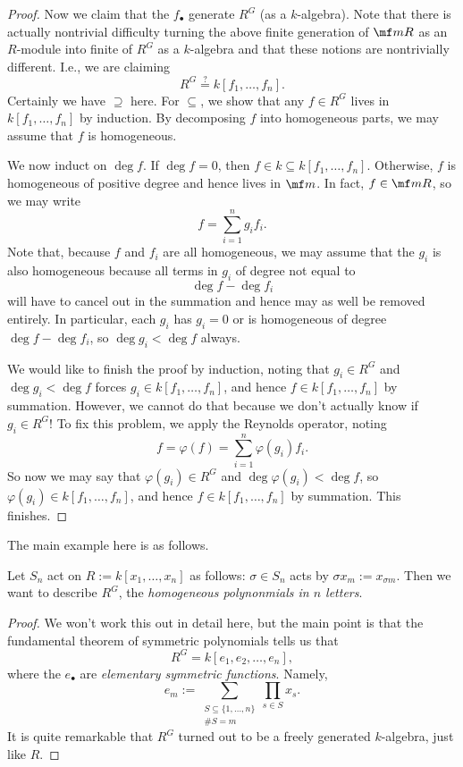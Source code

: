 \begin{proof}
	Now we claim that the $f_\bullet$ generate $R^G$ (as a $k$-algebra). Note that there is actually nontrivial difficulty turning the above finite generation of $\mf mR$ as an $R$-module into finite of $R^G$ as a $k$-algebra and that these notions are nontrivially different. I.e., we are claiming
	\[R^G\stackrel?=k[f_1,\ldots,f_n].\]
	Certainly we have $\supseteq$ here. For $\subseteq$, we show that any $f\in R^G$ lives in $k[f_1,\ldots,f_n]$ by induction. By decomposing $f$ into homogeneous parts, we may assume that $f$ is homogeneous.

	We now induct on $\deg f$. If $\deg f=0$, then $f\in k\subseteq k[f_1,\ldots,f_n]$. Otherwise, $f$ is homogeneous of positive degree and hence lives in $\mf m$. In fact, $f\in\mf mR$, so we may write
	\[f=\sum_{i=1}^ng_if_i.\]
	Note that, because $f$ and $f_i$ are all homogeneous, we may assume that the $g_i$ is also homogeneous because all terms in $g_i$ of degree not equal to
	\[\deg f-\deg f_i\]
	will have to cancel out in the summation and hence may as well be removed entirely. In particular, each $g_i$ has $g_i=0$ or is homogeneous of degree $\deg f-\deg f_i$, so $\deg g_i<\deg f$ always.

	We would like to finish the proof by induction, noting that $g_i\in R^G$ and $\deg g_i<\deg f$ forces $g_i\in k[f_1,\ldots,f_n]$, and hence $f\in k[f_1,\ldots,f_n]$ by summation. However, we cannot do that because we don't actually know if $g_i\in R^G$! To fix this problem, we apply the Reynolds operator, noting
	\[f=\varphi(f)=\sum_{i=1}^n\varphi(g_i)f_i.\]
	So now we may say that $\varphi(g_i)\in R^G$ and $\deg\varphi(g_i)<\deg f$, so $\varphi(g_i)\in k[f_1,\ldots,f_n]$, and hence $f\in k[f_1,\ldots,f_n]$ by summation. This finishes.
\end{proof}
The main example here is as follows.
\begin{exe}
	Let $S_n$ act on $R:=k[x_1,\ldots,x_n]$ as follows: $\sigma\in S_n$ acts by $\sigma x_m:=x_{\sigma m}$. Then we want to describe $R^G$, the \textit{homogeneous polynonmials in $n$ letters}.
\end{exe}
\begin{proof}
	We won't work this out in detail here, but the main point is that the fundamental theorem of symmetric polynomials tells us that
	\[R^G=k[e_1,e_2,\ldots,e_n],\]
	where the $e_\bullet$ are \textit{elementary symmetric functions}. Namely,
	\[e_m:=\sum_{\substack{S\subseteq\{1,\ldots,n\}\\\#S=m}}\prod_{s\in S}x_s.\]
	It is quite remarkable that $R^G$ turned out to be a freely generated $k$-algebra, just like $R$.
\end{proof}
